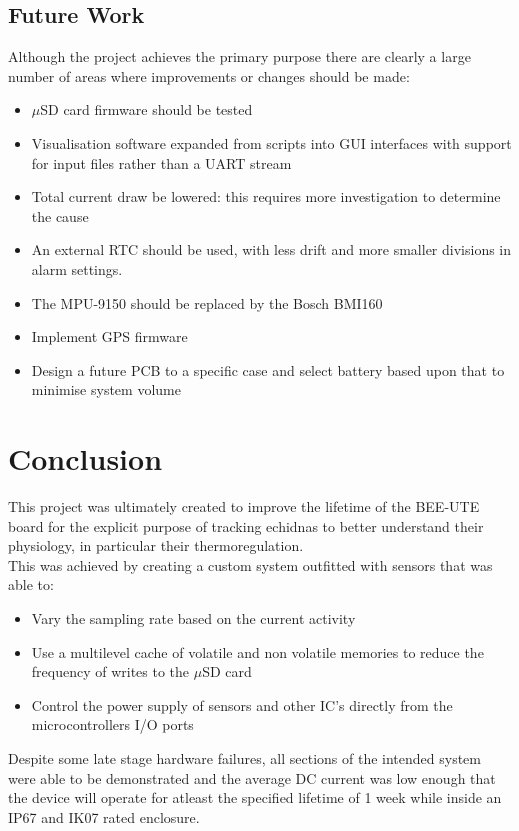 \documentclass[12pt,openany,a4paper]{book}
\begin{document}
	\section{Future Work} \label{sec:FUTURE}
		Although the project achieves the primary purpose there are clearly a large number of areas where improvements or changes should be made:
		\begin{itemize}
			\item $\mu$SD card firmware should be tested
			\item Visualisation software expanded from scripts into GUI interfaces with support for input files rather than a UART stream
			\item Total current draw be lowered: this requires more investigation to determine the cause
			\item An external RTC should be used, with less drift and more smaller divisions in alarm settings.
			\item The MPU-9150 should be replaced by the Bosch BMI160
			\item Implement GPS firmware
			\item Design a future PCB to a specific case and select battery based upon that to minimise system volume
		\end{itemize}

\chapter{Conclusion}
	This project was ultimately created to improve the lifetime of the BEE-UTE board for the explicit purpose of tracking echidnas to better understand their physiology, in particular their thermoregulation. \\
	
	This was achieved by creating a custom system outfitted with sensors that was able to:
		\begin{itemize}
			\item Vary the sampling rate based on the current activity
			\item Use a multilevel cache of volatile and non volatile memories to reduce the frequency of writes to the $\mu$SD card
			\item Control the power supply of sensors and other IC's directly from the microcontrollers I/O ports
		\end{itemize}
	Despite some late stage hardware failures, all sections of the intended system were able to be demonstrated and the average DC current was low enough that the device will operate for atleast the specified lifetime of 1 week while inside an IP67 and IK07 rated enclosure. \\
\end{document}

